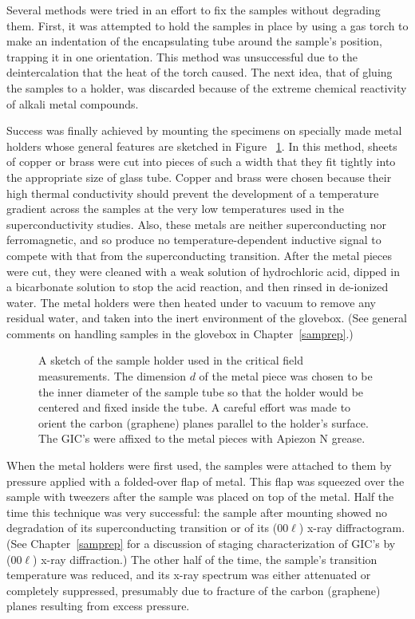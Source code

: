 	Several methods were tried in an effort to fix the  samples without
degrading them.  First, it was  attempted  to hold the  samples in place by
using a gas torch  to make an  indentation of the encapsulating tube around
the sample's  position, trapping it  in one  orientation.  This method  was
unsuccessful due to the deintercalation that the heat of  the torch caused.
The   next idea,   that of gluing  the samples  to a  holder, was discarded
because of the extreme chemical reactivity of alkali metal compounds.

	 Success  was finally   achieved  by   mounting the specimens    on
specially made metal holders whose general features are  sketched in Figure
~\ref{fig:holder}.  In this method, sheets of copper or brass were cut into
pieces of such a width that they fit tightly  into the  appropriate size of
glass tube.  Copper and  brass   were   chosen because  their high  thermal
conductivity  should  prevent  the  development of  a  temperature gradient
across  the     samples at  the  very   low    temperatures  used  in   the
superconductivity studies.  Also, these  metals are neither superconducting
nor ferromagnetic, and so produce no temperature-dependent inductive signal
to compete with that from the superconducting  transition.  After the metal
pieces were  cut, they were cleaned  with  a  weak solution of hydrochloric
acid, dipped in a bicarbonate solution to stop the  acid reaction, and then
rinsed in de-ionized  water.  The metal holders were  then heated under  to
vacuum to remove any residual water, and  taken  into the inert environment
of the glovebox.  (See general comments on handling samples in the glovebox
in Chapter~\ref{samprep}.)

\begin{figure}
\vspace{5in}
\caption[Sample holder used in critical field measurements.]{A sketch of the sample holder used in the critical field
measurements.   The dimension  $d$ of the metal piece  was chosen to be the
inner diameter of the sample tube so that the holder would  be centered and
fixed  inside the tube.   A careful effort  was  made  to orient the carbon
(graphene) planes parallel to the holder's surface.  The GIC's were affixed
to the metal pieces with Apiezon N grease.}
\label{fig:holder}
\end{figure}

	When the metal holders  were first  used, the samples were attached
to them by pressure  applied with a folded-over  flap of metal.   This flap
was squeezed over the sample with  tweezers after the  sample was placed on
top of the  metal.  Half the time this  technique was  very successful: the
sample after mounting   showed  no  degradation   of  its   superconducting
transition    or    of    its  (00$\ell$)    x-ray    diffractogram.   (See
Chapter~\ref{samprep} for a discussion of staging characterization of GIC's
by (00$\ell$) x-ray diffraction.)  The other half of the time, the sample's
transition temperature  was reduced,  and  its x-ray  spectrum   was either
attenuated or completely  suppressed,  presumably  due to  fracture of  the
carbon (graphene) planes resulting from excess pressure.


